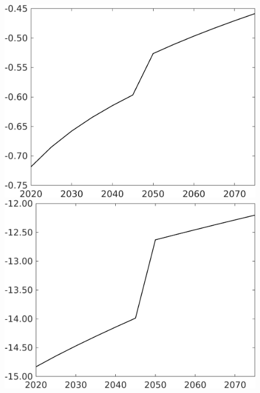 \documentclass[12pt]{article}
\begin{document}
\begin{figure}[h!!]
\begin{minipage}[]{0.32\textwidth}
	\end{minipage}	
	\begin{minipage}[]{0.32\textwidth}
		\includegraphics[width=1\textwidth]{../../codding_model/own_basedOnFried/optimalPol_010922_revision/figures/all_13Sept22/CompTaufPER_bytaul_Reg0_Lf_spillover0_nsk0_xgr1_knspil0_sep1_LFlimit1_emsbase0_countec0_GovRev0_etaa0.79_lgd0.png}
	\end{minipage}		
	\begin{minipage}[]{0.32\textwidth}
		\includegraphics[width=1\textwidth]{../../codding_model/own_basedOnFried/optimalPol_010922_revision/figures/all_13Sept22/CompTaufPER_bytaul_Reg0_Lg_spillover0_nsk0_xgr1_knspil0_sep1_LFlimit1_emsbase0_countec0_GovRev0_etaa0.79_lgd0.png}

\end{minipage}
\end{figure}
\end{document}
